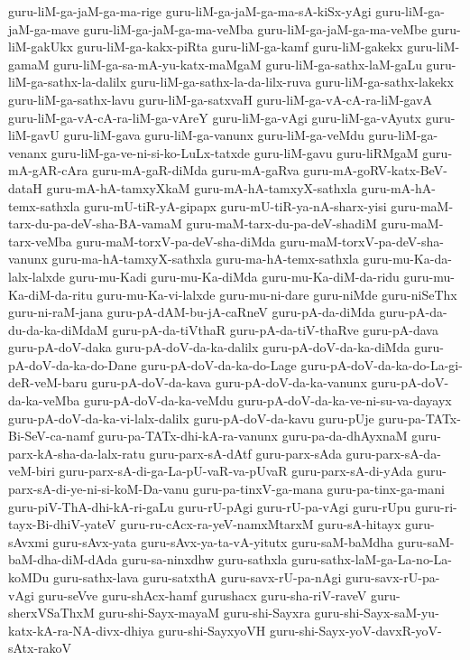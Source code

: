 {guru-liM-ga-jaM-ga-ma-rige
guru-liM-ga-jaM-ga-ma-sA-kiSx-yAgi
guru-liM-ga-jaM-ga-mave
guru-liM-ga-jaM-ga-ma-veMba
guru-liM-ga-jaM-ga-ma-veMbe
guru-liM-gakUkx
guru-liM-ga-kakx-piRta
guru-liM-ga-kamf
guru-liM-gakekx
guru-liM-gamaM
guru-liM-ga-sa-mA-yu-katx-maMgaM
guru-liM-ga-sathx-laM-gaLu
guru-liM-ga-sathx-la-dalilx
guru-liM-ga-sathx-la-da-lilx-ruva
guru-liM-ga-sathx-lakekx
guru-liM-ga-sathx-lavu
guru-liM-ga-satxvaH
guru-liM-ga-vA-cA-ra-liM-gavA
guru-liM-ga-vA-cA-ra-liM-ga-vAreY
guru-liM-ga-vAgi
guru-liM-ga-vAyutx
guru-liM-gavU
guru-liM-gava
guru-liM-ga-vanunx
guru-liM-ga-veMdu
guru-liM-ga-venanx
guru-liM-ga-ve-ni-si-ko-LuLx-tatxde
guru-liM-gavu
guru-liRMgaM
guru-mA-gAR-cAra
guru-mA-gaR-diMda
guru-mA-gaRva
guru-mA-goRV-katx-BeV-dataH
guru-mA-hA-tamxyXkaM
guru-mA-hA-tamxyX-sathxla
guru-mA-hA-temx-sathxla
guru-mU-tiR-yA-gipapx
guru-mU-tiR-ya-nA-sharx-yisi
guru-maM-tarx-du-pa-deV-sha-BA-vamaM
guru-maM-tarx-du-pa-deV-shadiM
guru-maM-tarx-veMba
guru-maM-torxV-pa-deV-sha-diMda
guru-maM-torxV-pa-deV-sha-vanunx
guru-ma-hA-tamxyX-sathxla
guru-ma-hA-temx-sathxla
guru-mu-Ka-da-lalx-lalxde
guru-mu-Kadi
guru-mu-Ka-diMda
guru-mu-Ka-diM-da-ridu
guru-mu-Ka-diM-da-ritu
guru-mu-Ka-vi-lalxde
guru-mu-ni-dare
guru-niMde
guru-niSeThx
guru-ni-raM-jana
guru-pA-dAM-bu-jA-caRneV
guru-pA-da-diMda
guru-pA-da-du-da-ka-diMdaM
guru-pA-da-tiVthaR
guru-pA-da-tiV-thaRve
guru-pA-dava
guru-pA-doV-daka
guru-pA-doV-da-ka-dalilx
guru-pA-doV-da-ka-diMda
guru-pA-doV-da-ka-do-Dane
guru-pA-doV-da-ka-do-Lage
guru-pA-doV-da-ka-do-La-gi-deR-veM-baru
guru-pA-doV-da-kava
guru-pA-doV-da-ka-vanunx
guru-pA-doV-da-ka-veMba
guru-pA-doV-da-ka-veMdu
guru-pA-doV-da-ka-ve-ni-su-va-dayayx
guru-pA-doV-da-ka-vi-lalx-dalilx
guru-pA-doV-da-kavu
guru-pUje
guru-pa-TATx-Bi-SeV-ca-namf
guru-pa-TATx-dhi-kA-ra-vanunx
guru-pa-da-dhAyxnaM
guru-parx-kA-sha-da-lalx-ratu
guru-parx-sA-dAtf
guru-parx-sAda
guru-parx-sA-da-veM-biri
guru-parx-sA-di-ga-La-pU-vaR-va-pUvaR
guru-parx-sA-di-yAda
guru-parx-sA-di-ye-ni-si-koM-Da-vanu
guru-pa-tinxV-ga-mana
guru-pa-tinx-ga-mani
guru-piV-ThA-dhi-kA-ri-gaLu
guru-rU-pAgi
guru-rU-pa-vAgi
guru-rUpu
guru-ri-tayx-Bi-dhiV-yateV
guru-ru-cAcx-ra-yeV-namxMtarxM
guru-sA-hitayx
guru-sAvxmi
guru-sAvx-yata
guru-sAvx-ya-ta-vA-yitutx
guru-saM-baMdha
guru-saM-baM-dha-diM-dAda
guru-sa-ninxdhw
guru-sathxla
guru-sathx-laM-ga-La-no-La-koMDu
guru-sathx-lava
guru-satxthA
guru-savx-rU-pa-nAgi
guru-savx-rU-pa-vAgi
guru-seVve
guru-shAcx-hamf
gurushacx
guru-sha-riV-raveV
guru-sherxVSaThxM
guru-shi-Sayx-mayaM
guru-shi-Sayxra
guru-shi-Sayx-saM-yu-katx-kA-ra-NA-divx-dhiya
guru-shi-SayxyoVH
guru-shi-Sayx-yoV-davxR-yoV-sAtx-rakoV
}

